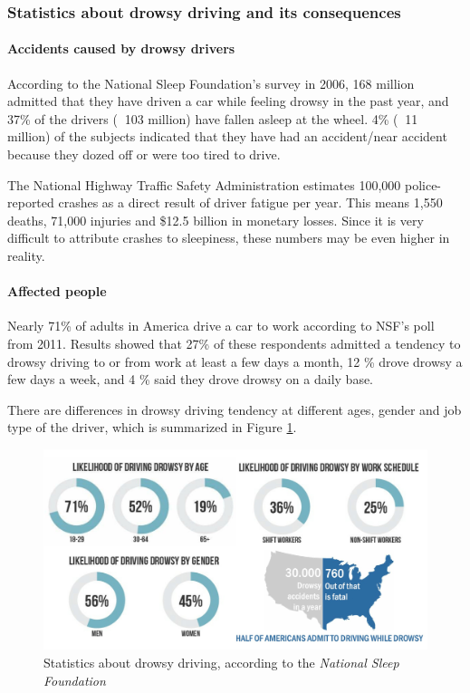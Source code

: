 \documentclass[letterpaper,10pt]{article}
\begin{document}
\subsubsection{Statistics about drowsy driving and its consequences}

\paragraph{Accidents caused by drowsy drivers}

According to the National Sleep Foundation’s survey in 2006, 168 million admitted that they have driven a car while feeling drowsy in the past year, and 37\% of the drivers ($~$ 103 million) have fallen asleep at the wheel. 4\% ($~$ 11 million) of the subjects indicated that they have had an accident/near accident because they dozed off or were too tired to drive.

The National Highway Traffic Safety Administration estimates 100,000 police-reported crashes as a direct result of driver fatigue per year. 
This means 1,550 deaths, 71,000 injuries and \$12.5 billion in monetary losses. 
Since it is very difficult to attribute crashes to sleepiness, these numbers may be even higher in reality. 

\paragraph{Affected people}

Nearly 71\%  of adults in America drive a car to work according to NSF’s poll from 2011. Results showed that 27\% of these respondents admitted a tendency to drowsy driving to or from work at least a few days a month, 12 \% drove drowsy a few days a week, and 4 \% said they drove drowsy on a daily base. \cite{drowsy}

There are differences in drowsy driving tendency at different ages, gender and job type of the driver, which is summarized in Figure \ref{fig:dowsychat}.

\begin{figure}[h]
\centering
\includegraphics[scale=0.25]{drowsy_stat.jpg}
\caption[Statistics about drowsy driving]{Statistics about drowsy driving, according to the \textit{National Sleep Foundation} \cite{national_sleep}}
\label{fig:dowsychat}
\end{figure}
\end{document}

